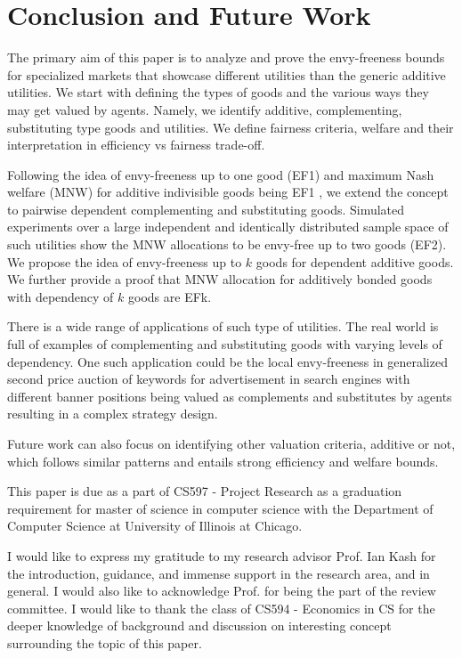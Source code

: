 \section{Conclusion and Future Work}
\label{section_conclusion}

The primary aim of this paper is to analyze and prove the envy-freeness bounds for specialized markets that showcase different utilities than the generic additive utilities. We start with defining the types of goods and the various ways they may get valued by agents. Namely, we identify additive, complementing, substituting type goods and utilities. We define fairness criteria, welfare and their interpretation in efficiency vs fairness trade-off. 

Following the idea of envy-freeness up to one good (EF1) and maximum Nash welfare (MNW) for additive indivisible goods being EF1 \cite{caragiannis2016unreasonable}, we extend the concept to pairwise dependent complementing and substituting goods. Simulated experiments over a large independent and identically distributed sample space of such utilities show the MNW allocations to be envy-free up to two goods (EF2). We propose the idea of envy-freeness up to $k$ goods for dependent additive goods. We further provide a proof that MNW allocation for additively bonded goods with depend\-ency of $k$ goods are EFk.

There is a wide range of applications of such type of utilities. The real world is full of examples of complementing and substituting goods with varying levels of dependency. One such application could be the local envy-freeness in generalized second price auction of keywords for advertisement in search engines \cite{edelman2007internet} with different banner positions being valued as complements and substitutes by agents resulting in a complex strategy design. 

Future work can also focus on identifying other valuation criteria, additive or not, which follows similar patterns and entails strong efficiency and welfare bounds.


\begin{acks}
This paper is due as a part of CS597 - Project Research as a graduation requirement for master of science in computer science with the Department of Computer Science at University of Illinois at Chicago.

I would like to express my gratitude to my research advisor Prof. Ian Kash for the introduction, guidance, and immense support in the research area, and in general. I would also like to acknowledge Prof.           for being the part of the review committee. I would like to thank the class of CS594 - Economics in CS for the deeper knowledge of background and discussion on interesting concept surrounding the topic of this paper.


\end{acks}